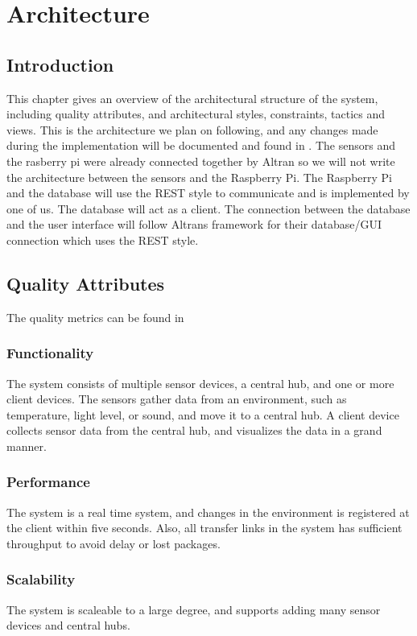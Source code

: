 \documentclass[../document.tex]{subfiles}
\begin{document}
\section{Architecture}
\label{architecture}
\subsection{Introduction}
This chapter gives an overview of the architectural structure of the system, including quality attributes, and architectural styles, constraints, tactics and views. This is the architecture we plan on following, and any changes made during the implementation will be documented and found in . The sensors and the rasberry pi were already connected together by \gls{Altran} so we will not write the architecture between the sensors and the Raspberry Pi. The Raspberry Pi and the database will use the REST style to communicate and is implemented by one of us. The database will act as a client. The connection between the database and the user interface will follow Altrans framework for their database/GUI connection which uses the REST style.

\subsection{Quality Attributes}
\label{quality_attributes}
The quality metrics can be found in 

\subsubsection{Functionality}
The system consists of multiple sensor devices, a central hub, and one or more client devices. The sensors gather data from an environment, such as temperature, light level, or sound, and move it to a central hub. A client device collects sensor data from the central hub, and visualizes the data in a grand manner.

\subsubsection{Performance}
The system is a real time system, and changes in the environment is registered at the client within five seconds. Also, all transfer links in the system has sufficient throughput to avoid delay or lost packages.

\subsubsection{Scalability}
The system is scaleable to a large degree, and supports adding many sensor devices and central hubs.
\end{document}
